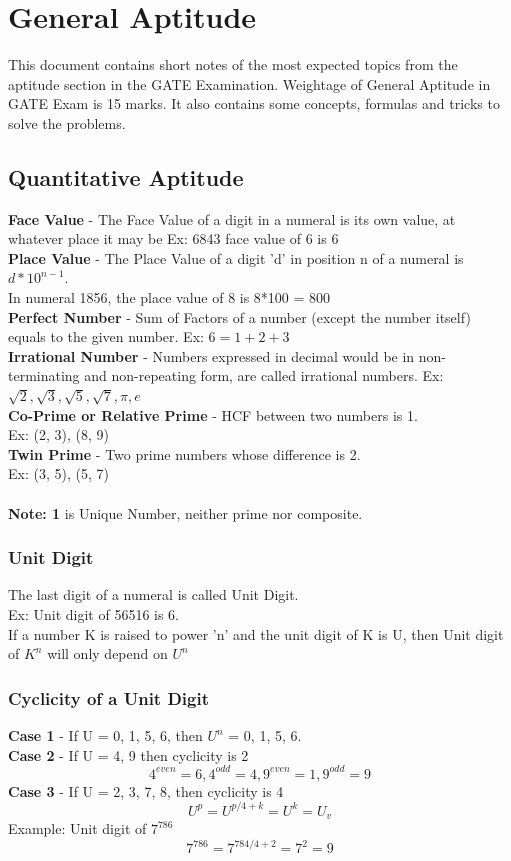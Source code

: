 \chapter[General Aptitude]{General Aptitude}

This document contains short notes of the most expected topics from the aptitude section in the GATE Examination. Weightage of General Aptitude in GATE Exam is 15 marks.
It also contains some concepts, formulas and tricks to solve the problems.

\section{Quantitative Aptitude}

\textbf{Face Value} - The Face Value of a digit in a numeral is its own value, at whatever place it may be Ex: 6843 face value of 6 is 6\\
\textbf{Place Value} - The Place Value of a digit 'd' in position n of a numeral is \(d * 10^{n-1}\).\\ In numeral 1856, the place value of 8 is 8*100 = 800\\
\textbf{Perfect Number} - Sum of Factors of a number (except the number itself) equals to the given number. Ex: \(6=1+2+3\)\\
\textbf{Irrational Number} - Numbers expressed in decimal would be in non-terminating and non-repeating form, are called irrational numbers. Ex: \(\sqrt{2}, \sqrt{3}, \sqrt{5}, \sqrt{7}, \pi, e \) \\
\textbf{Co-Prime or Relative Prime} - HCF between two numbers is 1.\\
Ex: (2, 3), (8, 9)\\
\textbf{Twin Prime} - Two prime numbers whose difference is 2. \\Ex: (3, 5), (5, 7)\\
\\\textbf{Note: 1} is Unique Number, neither prime nor composite.


\subsection{Unit Digit}
The last digit of a numeral is called Unit Digit.\\
Ex: Unit digit of 56516 is 6.\\
If a number K is raised to power 'n' and the unit digit of K is U, then Unit digit of \(K^n\) will only depend on \(U^n\)


\subsection{Cyclicity of a Unit Digit}
\textbf{Case 1} - If U = 0, 1, 5, 6, then \(U^n\) = 0, 1, 5, 6.\\
\textbf{Case 2} - If U = 4, 9 then cyclicity is 2
\[4^{even} = 6,  4^{odd} = 4, 9^{even} = 1, 9^{odd} = 9\]
\textbf{Case 3} - If U = 2, 3, 7, 8, then cyclicity is 4
\[U^p = U^{p/4 + k} = U^k = U_v\]
Example: Unit digit of \(7^{786}\) \[7^{786} = 7^{784/4 + 2} = 7^2 = 9\]


